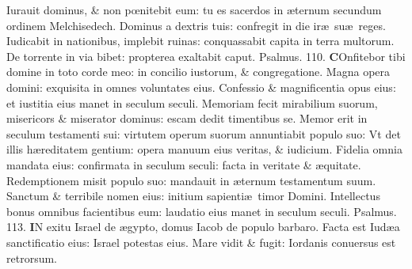 \documentclass[a5paper,10pt]{book}
\def\ae{æ}
\def\oe{œ}
\begin{document}
\begin{multicols*}{2}
\newline \color{red} I\color{black}urauit dominus, \& non p\oe nitebit eum: tu es sacerdos in \ae ternum secundum ordinem Melchisedech.
\newline \color{red} D\color{black}ominus a dextris tuis: confregit in die ir\ae \ su\ae \ reges.
\newline \color{red} I\color{black}udicabit in nationibus, implebit ruinas: conquassabit capita in terra multorum.
\newline \color{red} D\color{black}e torrente in via bibet: propterea exaltabit caput. \quad \color{red} Psalmus. 110. \color{black}
\vspace{-.5em}
\lettrine[lines=2]{\bfseries \color{red} C}{}Onfitebor tibi domine in toto corde meo: in concilio iustorum, \& congregatione.%
\newline \color{red} M\color{black}agna opera domini: exquisita in omnes voluntates eius.
\newline \color{red} C\color{black}onfessio \& magnificentia opus eius: et iustitia eius manet in seculum seculi.
\newline \color{red} M\color{black}emoriam fecit mirabilium suorum, misericors \& miserator dominus: escam dedit timentibus se.
\newline \color{red} M\color{black}emor erit in seculum testamenti sui: virtutem operum suorum annuntiabit populo suo:
\newline \color{red} V\color{black}t det illis h\ae reditatem gentium: opera manuum eius veritas, \& iudicium.
\newline \color{red} F\color{black}idelia omnia mandata eius: confirmata in seculum seculi: facta in veritate \& \ae quitate.
\newline \color{red} R\color{black}edemptionem misit populo suo: mandauit in \ae ternum testamentum suum.
\newline \color{red} S\color{black}anctum \& terribile nomen eius: initium sapienti\ae \ timor Domini.
\newline \color{red} I\color{black}ntellectus bonus omnibus facientibus eum: laudatio eius manet in seculum seculi. \quad \color{red} Psalmus. 113. \color{black}
\vspace{-.5em}
\lettrine[lines=2]{\bfseries \color{red} I}{}N exitu Israel de \ae gypto, domus Iacob de populo barbaro.
\newline \color{red} F\color{black}acta est Iud\ae a sanctificatio eius: Israel potestas eius.
\newline \color{red} M\color{black}are vidit \& fugit: Iordanis conuersus est retrorsum.

\end{multicols*}
\end{document}

